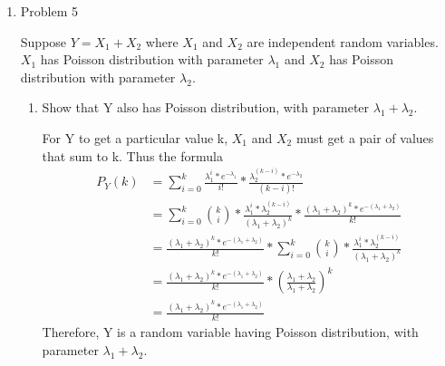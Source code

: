 \documentclass[letterpaper]{article}
\begin{document}
\begin{enumerate}
\medskip
\newpage

\item{Problem 5}
\begin{mdframed}
Suppose $Y = X_1 + X_2$ where $X_1$ and $X_2$ are independent random variables. $X_1$ has Poisson distribution with parameter $\lambda_1$ and $X_2$ has Poisson distribution with parameter $\lambda_2$.
\end{mdframed}
\begin{enumerate}
\item{} Show that Y also has Poisson distribution, with parameter $\lambda_1 + \lambda_2$.

For Y to get a particular value k, $X_1$ and $X_2$ must get a pair of values that sum to k. Thus the formula
\begin{equation}
\begin{split}
P_Y(k) &= \sum_{i = 0}^{k}{\frac{\lambda_1^i * e^{-\lambda_1}}{i!} * \frac{\lambda_2^{(k - i)} * e^{-\lambda_2}}{(k - i)!}}\\
           &= \sum_{i = 0}^{k}{{k \choose i} * \frac{\lambda_1^i * \lambda_2^{(k - i)}}{(\lambda_1 + \lambda_2)^k} * \frac{(\lambda_1 + \lambda_2)^k * e^{-(\lambda_1 + \lambda_2)}}{k!}}\\
           &=  \frac{(\lambda_1 + \lambda_2)^k * e^{-(\lambda_1 + \lambda_2)}}{k!} * \sum_{i = 0}^{k}{{k \choose i} * \frac{\lambda_1^i * \lambda_2^{(k - i)}}{(\lambda_1 + \lambda_2)^k}}\\
           &=  \frac{(\lambda_1 + \lambda_2)^k * e^{-(\lambda_1 + \lambda_2)}}{k!} * (\frac{\lambda_1 + \lambda_2}{\lambda_1 + \lambda_2})^k\\
           &=  \frac{(\lambda_1 + \lambda_2)^k * e^{-(\lambda_1 + \lambda_2)}}{k!}
\end{split}
\end{equation}
Therefore, Y is a random variable having Poisson distribution, with parameter $\lambda_1 + \lambda_2$.


\end{enumerate}
\end{enumerate}
\end{document}
